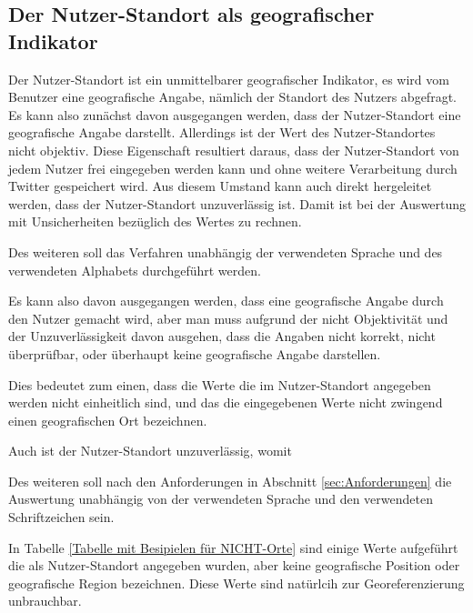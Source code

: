 		\subsection{Der Nutzer-Standort als geografischer Indikator} 

		Der Nutzer-Standort ist ein unmittelbarer geografischer Indikator, es wird vom Benutzer eine geografische Angabe, nämlich der Standort des Nutzers abgefragt. 
		Es kann also zunächst davon ausgegangen werden, dass der Nutzer-Standort eine geografische Angabe darstellt.
		Allerdings ist der Wert des Nutzer-Standortes nicht objektiv.
		Diese Eigenschaft resultiert daraus, dass der Nutzer-Standort von jedem Nutzer frei eingegeben werden kann und ohne weitere Verarbeitung durch Twitter gespeichert wird. 
		Aus diesem Umstand kann auch direkt hergeleitet werden, dass der Nutzer-Standort unzuverlässig ist.
		Damit ist bei der Auswertung mit Unsicherheiten bezüglich des Wertes zu rechnen. 
		
		Des weiteren soll das Verfahren unabhängig der verwendeten Sprache und des verwendeten Alphabets durchgeführt werden.

		Es kann also davon ausgegangen werden, dass eine geografische Angabe durch den Nutzer gemacht wird, aber man muss aufgrund der nicht Objektivität und der Unzuverlässigkeit davon ausgehen, dass die Angaben nicht korrekt, nicht überprüfbar, oder überhaupt keine geografische Angabe darstellen. 

		Dies bedeutet zum einen, dass die Werte die im Nutzer-Standort angegeben werden nicht einheitlich sind, und das die eingegebenen Werte nicht zwingend einen geografischen Ort bezeichnen. 

		Auch ist der Nutzer-Standort unzuverlässig, womit
		



		Des weiteren soll nach den Anforderungen in Abschnitt \ref{sec:Anforderungen} die Auswertung unabhängig von der verwendeten Sprache und den verwendeten Schriftzeichen sein. 


		

		In Tabelle \ref{Tabelle mit Besipielen für NICHT-Orte} sind einige Werte aufgeführt die als Nutzer-Standort angegeben wurden, aber keine geografische Position oder geografische Region bezeichnen. 
		Diese Werte sind natürlcih zur Georeferenzierung unbrauchbar. 


